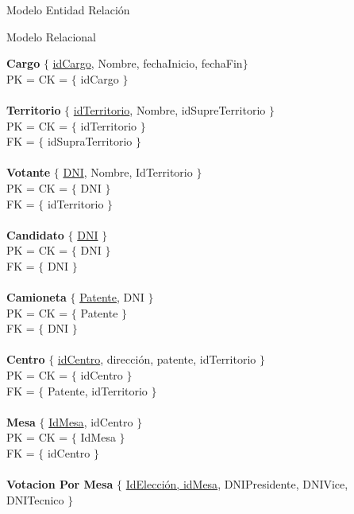 \begin{section}{Modelo Entidad Relaci\'on}

\begin{subsection}{Modelo Relacional}

\noindent\textbf{Cargo} $ \lbrace $ \underline{idCargo}, Nombre, fechaInicio, fechaFin$ \rbrace $ \\
PK = CK = $ \lbrace $ idCargo $ \rbrace $ \\
\\
\textbf{Territorio} $ \lbrace $ \underline{idTerritorio}, Nombre, idSupreTerritorio $ \rbrace $ \\
PK = CK = $ \lbrace $ idTerritorio $ \rbrace $ \\
FK = $ \lbrace $ idSupraTerritorio $ \rbrace $\\
\\
\textbf{Votante} $ \lbrace $ \underline{DNI}, Nombre, IdTerritorio $ \rbrace $\\
PK = CK = $ \lbrace $ DNI $ \rbrace $\\
FK = $ \lbrace $ idTerritorio $ \rbrace $\\
\\
\textbf{Candidato} $ \lbrace $ \underline{DNI} $ \rbrace $\\
PK = CK = $ \lbrace $ DNI $ \rbrace $\\
FK = $ \lbrace $ DNI $ \rbrace $\\
\\
\textbf{Camioneta} $ \lbrace $ \underline{Patente}, DNI $ \rbrace $\\
PK = CK = $ \lbrace $ Patente  $ \rbrace $\\
FK = $ \lbrace $ DNI $ \rbrace $\\
\\
\textbf{Centro} $ \lbrace $ \underline{idCentro}, direcci\'on, patente, idTerritorio $ \rbrace $ \\
PK = CK = $ \lbrace $ idCentro $ \rbrace $ \\
FK = $ \lbrace $ Patente, idTerritorio $ \rbrace $\\
\\
\textbf{Mesa} $ \lbrace $ \underline{IdMesa}, idCentro $ \rbrace $ \\
PK = CK = $ \lbrace $ IdMesa $ \rbrace $ \\
FK = $ \lbrace $ idCentro $ \rbrace $\\
\\
\textbf{Votacion Por Mesa} $ \lbrace $ \underline{IdElecci\'on, idMesa}, DNIPresidente, DNIVice, DNITecnico $ \rbrace $ \\

\end{subsection}
\end{section}
